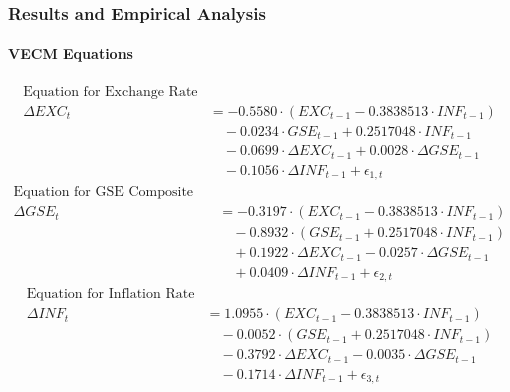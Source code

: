 \documentclass[12pt]{beamer}
\begin{document}
	\begin{frame}
		\frametitle{Results and Empirical Analysis}
		\framesubtitle{VECM Equations}
		\tiny
		\begin{equation}
			\begin{aligned}
				\text{Equation for Exchange Rate} \\
				\Delta EXC_t &= -0.5580 \cdot (EXC_{t-1} - 0.3838513 \cdot INF_{t-1}) \\
				&\quad - 0.0234 \cdot GSE_{t-1} + 0.2517048 \cdot INF_{t-1} \\
				&\quad - 0.0699 \cdot \Delta EXC_{t-1} + 0.0028 \cdot \Delta GSE_{t-1} \\
				&\quad - 0.1056 \cdot \Delta INF_{t-1} + \epsilon_{1,t}
			\end{aligned}
		\end{equation}
		\begin{equation}
			\begin{aligned}
				\text{Equation for GSE Composite Index} \\
				\Delta GSE_t &= -0.3197 \cdot (EXC_{t-1} - 0.3838513 \cdot INF_{t-1}) \\
				&\quad - 0.8932 \cdot (GSE_{t-1} + 0.2517048 \cdot INF_{t-1}) \\
				&\quad + 0.1922 \cdot \Delta EXC_{t-1} - 0.0257 \cdot \Delta GSE_{t-1} \\
				&\quad + 0.0409 \cdot \Delta INF_{t-1} + \epsilon_{2,t}
			\end{aligned}
		\end{equation}
		\begin{equation}
			\begin{aligned}
				\text{Equation for Inflation Rate} \\
				\Delta INF_t &= 1.0955 \cdot (EXC_{t-1} - 0.3838513 \cdot INF_{t-1}) \\
				&\quad - 0.0052 \cdot (GSE_{t-1} + 0.2517048 \cdot INF_{t-1}) \\
				&\quad - 0.3792 \cdot \Delta EXC_{t-1} - 0.0035 \cdot \Delta GSE_{t-1} \\
				&\quad - 0.1714 \cdot \Delta INF_{t-1} + \epsilon_{3,t}
			\end{aligned}
		\end{equation}
	\end{frame}



	
	
\end{document}
